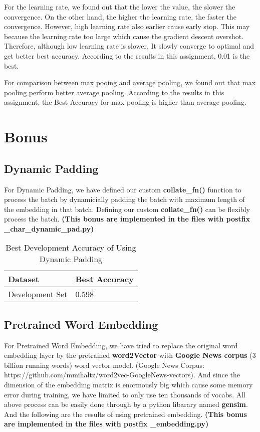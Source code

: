 \documentclass{article}
\begin{document}
For the learning rate, we found out that the lower the value, the slower the convergence. On the other hand, the higher the learning rate, the faster the convergence. However, high learning rate also earlier cause early stop. This may because the learning rate too large which cause the gradient descent overshot. Therefore, although low learning rate is slower, It slowly converge to optimal and get better best accuracy. According to the results in this assignment, 0.01 is the best.

For comparison between max pooing and average pooling, we found out that max pooling perform better average pooling. According to the results in this assignment, the Best Accuracy for max pooling is higher than average pooling.

\section{Bonus}

\subsection{Dynamic Padding}
For Dynamic Padding, we have defined our custom \textbf{collate\_fn()} function to process the batch by dynamicially padding the batch with maximum length of the embedding in that batch. Defining our custom \textbf{collate\_fn()} can be flexibly process the batch. \textbf{(This bonus are implemented in the files with postfix \_char\_dynamic\_pad.py)}

\begin{table}[htb]
	\caption{Best Development Accuracy of Using Dynamic Padding}
	\label{sample-table}
	\centering
	\begin{tabular}{ll}
		\toprule
		\cmidrule{1-2}
		Dataset & Best Accuracy\\
		\midrule
		Development Set & 0.598  \\
		\bottomrule
	\end{tabular}
\end{table}


\subsection{Pretrained Word Embedding}
For Pretrained Word Embedding, we have tried to replace the original word embedding layer by the pretrained \textbf{word2Vector} with \textbf{Google News corpus} (3 billion running words) word vector model. (Google News Corpus: https://github.com/mmihaltz/word2vec-GoogleNews-vectors). And since the dimension of the embedding matrix is enormously big which cause some memory error during training, we have limited to only use ten thousands of vocabs. All above process can be easily done through by a python libarary named \textbf{gensim}. And the following are the results of using pretrained embedding. \textbf{(This bonus are implemented in the files with postfix \_embedding.py)}
\end{document}
